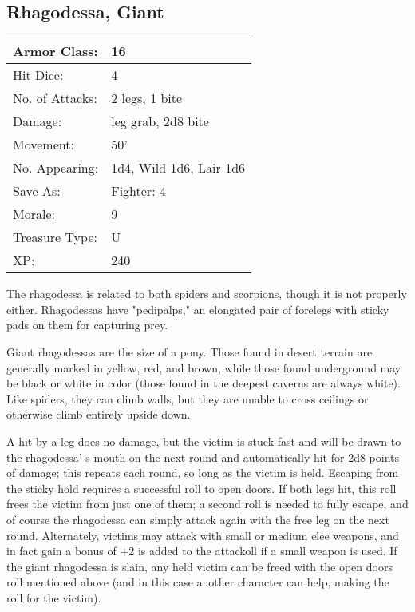 \documentclass[a4paper,twoside,openany,10pt]{book}
\begin{document}
\begin{multicols}{2}
\subsection*{Rhagodessa, Giant}\label{rhagodessa-giant}

\begin{tabularx}{0.50\textwidth}{@{}lX@{}}
Armor Class: & 16 \\\hline
Hit Dice: & 4 \\\hline
No. of Attacks: & 2 legs, 1 bite \\\hline
Damage: & leg grab, 2d8 bite \\\hline
Movement: & 50' \\\hline
No. Appearing: & 1d4, Wild 1d6, Lair 1d6 \\\hline
Save As: & Fighter: 4 \\\hline
Morale: & 9 \\\hline
Treasure Type: & U \\\hline
XP: & 240 \\\hline
\end{tabularx}\medskip

The rhagodessa is related to both spiders and scorpions, though it is not properly either. Rhagodessas have "pedipalps," an elongated pair of forelegs with sticky pads on them for capturing prey.

Giant rhagodessas are the size of a pony. Those found in desert terrain are generally marked in yellow, red, and brown, while those found underground may be black or white in color (those found in the deepest caverns are always white). Like spiders, they can climb walls, but they are unable to cross ceilings or otherwise climb entirely upside down.

A hit by a leg does no damage, but the victim is stuck fast and will be drawn to the rhagodessa' s mouth on the next round and automatically hit for 2d8 points of damage; this repeats each round, so long as the victim is held. Escaping from the sticky hold requires a successful roll to open doors. If both legs hit, this roll frees the victim from just one of them; a second roll is needed to fully escape, and of course the rhagodessa can simply attack again with the free leg on the next round. Alternately, victims may attack with small or medium elee weapons, and in fact gain a bonus of +2 is added to the attackoll if a small weapon is used. If the giant rhagodessa is slain, any held victim can be freed with the open doors roll mentioned above (and in this case another character can help, making the roll for the victim).


\end{multicols}
\end{document}
